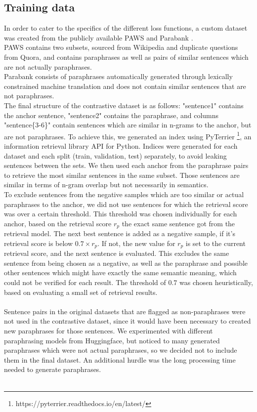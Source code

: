 \documentclass[11pt]{article}
\begin{document}
\subsection{Training data}
In order to cater to the specifics of the different loss functions, a custom dataset was created from the publicly available PAWS \cite{zhang2019paws} and Parabank \cite{hu2019parabank}. \\
PAWS contains two subsets, sourced from Wikipedia and duplicate questions from Quora, and contains paraphrases as well as pairs of similar sentences which are not actually paraphrases.\\
Parabank consists of paraphrases automatically generated through lexically constrained machine translation and does not contain similar sentences that are not paraphrases.\\
The final structure of the contrastive dataset is as follows: "sentence1" contains the anchor sentence, "sentence2" contains the paraphrase, and columns "sentence\{3-6\}" contain sentences which are similar in n-grams to the anchor, but are not paraphrases.
To achieve this, we generated an index using PyTerrier \footnote{https://pyterrier.readthedocs.io/en/latest/}, an information retrieval library API for Python.
Indices were generated for each dataset and each split (train, validation, test) separately, to avoid leaking sentences between the sets.
We then used each anchor from the paraphrase pairs to retrieve the most similar sentences in the same subset.
Those sentences are similar in terms of n-gram overlap but not necessarily in semantics.\\
To exclude sentences from the negative samples which are too similar or actual paraphrases to the anchor, we did not use sentences for which the retrieval score was over a certain threshold.
This threshold was chosen individually for each anchor, based on the retrieval score $r_p$ the exact same sentence got from the retrieval model.
The next best sentence is added as a negative sample, if it's retrieval score is below $0.7 \times r_p$. 
If not, the new value for $r_p$ is set to the current retrieval score, and the next sentence is evaluated.
This excludes the same sentence from being chosen as a negative, as well as the paraphrase and possible other sentences which might have exactly the same semantic meaning, which could not be verified for each result.
The threshold of $0.7$ was chosen heuristically, based on evaluating a small set of retrieval results. \\\\
Sentence pairs in the original datasets that are flagged as non-paraphrases were not used in the contrastive dataset, since it would have been necessary to created new paraphrases for those sentences.
We experimented with different paraphrasing models from Huggingface, but noticed to many generated paraphrases which were not actual paraphrases, so we decided not to include them in the final dataset.
An additional hurdle was the long processing time needed to generate paraphrases.\\\\
\end{document}
